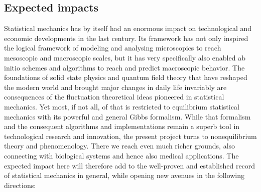 \subsection{Expected impacts}

Statistical mechanics has by itself had an enormous impact on technological and economic developments in the last century.  Its framework has not only inspired the logical framework of modeling and analysing microscopics to reach mesoscopic and macroscopic scales, but it has very specifically also enabled ab initio schemes and algorithms to reach and predict macroscopic behavior.  The foundations of solid state physics and quantum field theory that have reshaped the modern world and brought major changes in daily life invariably are consequences of the fluctuation theoretical ideas pioneered in statistical mechanics.  Yet most, if not all, of that is restricted to equilibrium statistical mechanics with its powerful and general Gibbs formalism.  While that formalism and the consequent algorithms and implementations remain a superb tool in technological research and innovation, the present project turns to nonequilibrium theory and phenomenology.  There we reach even much richer grounds, also connecting with biological systems and hence also medical applications.  The expected impact here will therefore add to the well-proven and established record of statistical mechanics in general, while opening new avenues in the following directions:\\

